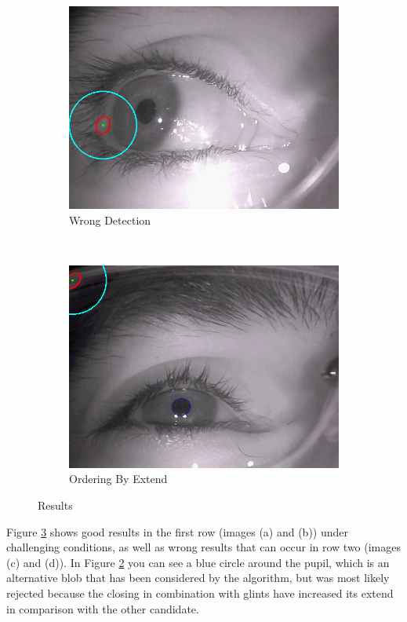 \begin{figure}[t]
	\begin{subfigure}[b]{0.5\textwidth}
		\centering
		\includegraphics[width=\textwidth]{Handin1/images/wrong1.png}
		\caption{Wrong Detection}
		\label{subfig:wrong1}
	\end{subfigure}%
	~
	\begin{subfigure}[b]{0.5\textwidth}
		\centering
		\includegraphics[width=\textwidth]{Handin1/images/wrong2.png}
		\caption{Ordering By Extend}
		\label{subfig:extend}
	\end{subfigure}
	
	\caption{Results}
	\label{fig:results}
\end{figure}

Figure \ref{fig:results} shows good results in the first row (images (a) and (b)) under challenging conditions, as well as wrong results that can occur in row two (images (c) and (d)). In Figure \ref{subfig:extend} you can see a blue circle around the pupil, which is an alternative blob that has been considered by the algorithm, but was most likely rejected because the closing in combination with glints have increased its extend in comparison with the other candidate.

